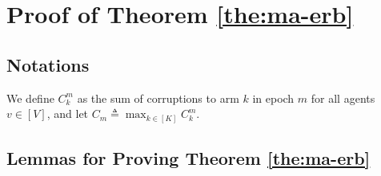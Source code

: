 \section{Proof of Theorem \ref{the:ma-erb}}
\label{ape:cma2b}

\subsection{Notations}
We define $C_k^m$ as the sum of corruptions to arm $k$ in epoch $m$ for all agents $v \in [V]$, and let $C_m \triangleq \max_{k \in [K]}C_k^m$.

\subsection{Lemmas for Proving Theorem \ref{the:ma-erb}}

